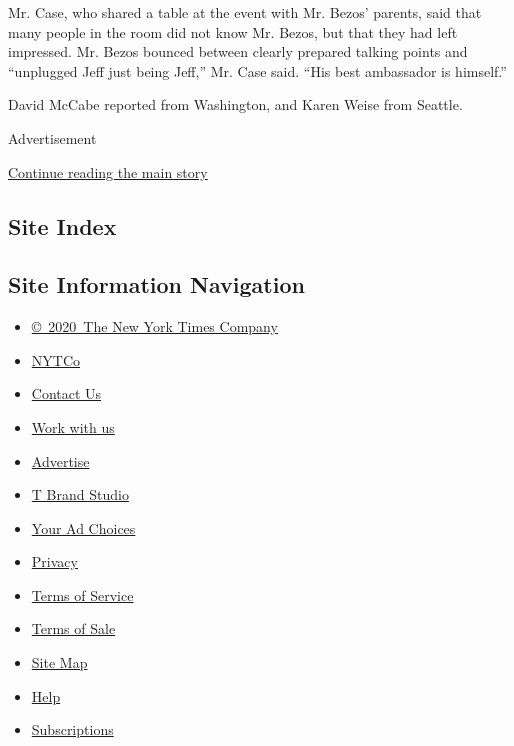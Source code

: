 Mr. Case, who shared a table at the event with Mr. Bezos' parents, said
that many people in the room did not know Mr. Bezos, but that they had
left impressed. Mr. Bezos bounced between clearly prepared talking
points and ``unplugged Jeff just being Jeff,'' Mr. Case said. ``His best
ambassador is himself.''

David McCabe reported from Washington, and Karen Weise from Seattle.

Advertisement

\protect\hyperlink{after-bottom}{Continue reading the main story}

\hypertarget{site-index}{%
\subsection{Site Index}\label{site-index}}

\hypertarget{site-information-navigation}{%
\subsection{Site Information
Navigation}\label{site-information-navigation}}

\begin{itemize}
\tightlist
\item
  \href{https://help.nytimes.com/hc/en-us/articles/115014792127-Copyright-notice}{©~2020~The
  New York Times Company}
\end{itemize}

\begin{itemize}
\tightlist
\item
  \href{https://www.nytco.com/}{NYTCo}
\item
  \href{https://help.nytimes.com/hc/en-us/articles/115015385887-Contact-Us}{Contact
  Us}
\item
  \href{https://www.nytco.com/careers/}{Work with us}
\item
  \href{https://nytmediakit.com/}{Advertise}
\item
  \href{http://www.tbrandstudio.com/}{T Brand Studio}
\item
  \href{https://www.nytimes.com/privacy/cookie-policy\#how-do-i-manage-trackers}{Your
  Ad Choices}
\item
  \href{https://www.nytimes.com/privacy}{Privacy}
\item
  \href{https://help.nytimes.com/hc/en-us/articles/115014893428-Terms-of-service}{Terms
  of Service}
\item
  \href{https://help.nytimes.com/hc/en-us/articles/115014893968-Terms-of-sale}{Terms
  of Sale}
\item
  \href{https://spiderbites.nytimes.com}{Site Map}
\item
  \href{https://help.nytimes.com/hc/en-us}{Help}
\item
  \href{https://www.nytimes.com/subscription?campaignId=37WXW}{Subscriptions}
\end{itemize}
